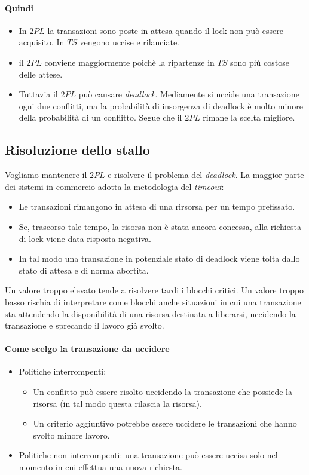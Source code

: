 \paragraph{Quindi}
\begin{itemize}
	\item In $2PL$ la transazioni sono poste in attesa quando il lock non può essere acquisito. In $TS$ vengono uccise e rilanciate.
	\item il $2PL$ conviene maggiormente poichè la ripartenze in $TS$ sono più costose delle attese.
	\item Tuttavia il $2PL$ può causare \emph{deadlock}. Mediamente si uccide una transazione ogni due conflitti, ma la probabilità di insorgenza di deadlock è molto minore della probabilità di un conflitto. Segue che il $2PL$ rimane la scelta migliore.
\end{itemize}
\subsection{Risoluzione dello stallo}
Vogliamo mantenere il $2PL$ e risolvere il problema del \emph{deadlock}. La maggior parte dei sistemi in commercio adotta la metodologia del \emph{timeout}:
\begin{itemize}
	\item Le transazioni rimangono in attesa di una rirsorsa per un tempo prefissato. 
	\item Se, trascorso tale tempo, la risorsa non è stata ancora concessa, alla richiesta di lock viene data risposta negativa. 
	\item In tal modo una transazione in potenziale stato di deadlock viene tolta dallo stato di attesa e di norma abortita. 
\end{itemize}
Un valore troppo elevato tende a risolvere tardi i blocchi critici. Un valore troppo basso rischia di interpretare come blocchi anche situazioni in cui una transazione sta attendendo la disponibilità di una risorsa destinata a liberarsi, uccidendo la transazione e sprecando il lavoro già svolto.
\paragraph{Come scelgo la transazione da uccidere} 
\begin{itemize}
	\item Politiche interrompenti:
	\begin{itemize}
		\item Un conflitto può essere risolto uccidendo la transazione che possiede la risorsa (in tal modo questa rilascia la risorsa). 
		\item Un criterio aggiuntivo potrebbe essere uccidere le transazioni che hanno svolto minore lavoro.
	\end{itemize}
	\item Politiche non interrompenti: una transazione può essere uccisa solo nel momento in cui effettua una nuova richiesta.
\end{itemize}
